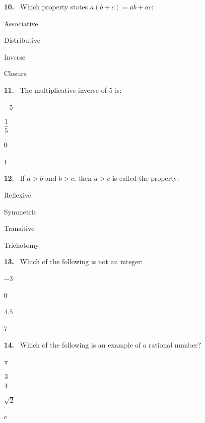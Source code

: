 \documentclass[11pt]{article}
\newenvironment{qenv}[1]{%
  \par\medskip\noindent\textbf{#1.}\ \ignorespaces
}{\par}
\begin{document}
\begin{qenv}{10} Which property states $a(b+c)=ab+ac$:
\begin{options} \item Associative \item Distributive \item Inverse \item Closure \end{options} \end{qenv}

\begin{qenv}{11} The multiplicative inverse of $5$ is:
\begin{options} \item $-5$ \item $\dfrac{1}{5}$ \item $0$ \item $1$ \end{options} \end{qenv}

\begin{qenv}{12} If $a>b$ and $b>c$, then $a>c$ is called the \underline{\hspace{2cm}} property:
\begin{options} \item Reflexive \item Symmetric \item Transitive \item Trichotomy \end{options} \end{qenv}

\begin{qenv}{13} Which of the following is not an integer:
\begin{options} \item $-3$ \item $0$ \item $4.5$ \item $7$ \end{options} \end{qenv}

\begin{qenv}{14} Which of the following is an example of a rational number?
\begin{options} \item $\pi$ \item $\dfrac{3}{4}$ \item $\sqrt{2}$ \item $e$ \end{options} \end{qenv}
\end{document}
